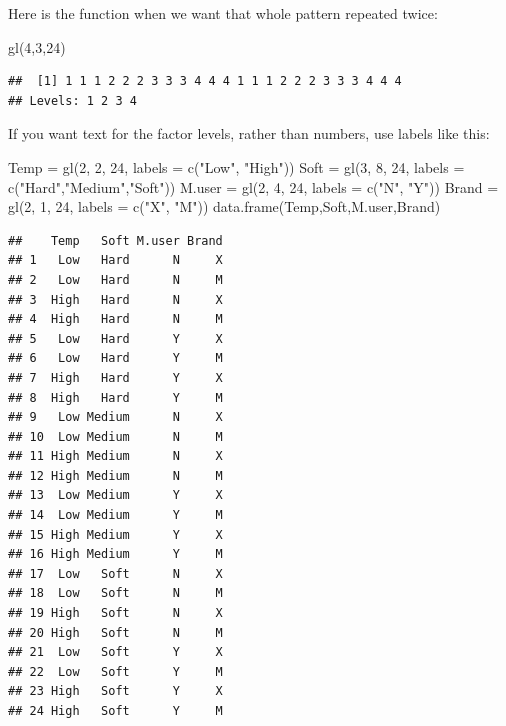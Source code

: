 \documentclass[
]{book}
\newenvironment{Shaded}{\begin{snugshade}}{\end{snugshade}}
\newcommand{\AttributeTok}[1]{\textcolor[rgb]{0.77,0.63,0.00}{#1}}
\newcommand{\DecValTok}[1]{\textcolor[rgb]{0.00,0.00,0.81}{#1}}
\newcommand{\FunctionTok}[1]{\textcolor[rgb]{0.00,0.00,0.00}{#1}}
\newcommand{\NormalTok}[1]{#1}
\newcommand{\OtherTok}[1]{\textcolor[rgb]{0.56,0.35,0.01}{#1}}
\newcommand{\StringTok}[1]{\textcolor[rgb]{0.31,0.60,0.02}{#1}}
\begin{document}
Here is the function when we want that whole pattern repeated twice:

\begin{Shaded}
\begin{Highlighting}[]
\FunctionTok{gl}\NormalTok{(}\DecValTok{4}\NormalTok{,}\DecValTok{3}\NormalTok{,}\DecValTok{24}\NormalTok{)}
\end{Highlighting}
\end{Shaded}

\begin{verbatim}
##  [1] 1 1 1 2 2 2 3 3 3 4 4 4 1 1 1 2 2 2 3 3 3 4 4 4
## Levels: 1 2 3 4
\end{verbatim}

If you want text for the factor levels, rather than numbers, use labels like this:

\begin{Shaded}
\begin{Highlighting}[]
\NormalTok{Temp }\OtherTok{=} \FunctionTok{gl}\NormalTok{(}\DecValTok{2}\NormalTok{, }\DecValTok{2}\NormalTok{, }\DecValTok{24}\NormalTok{, }\AttributeTok{labels =} \FunctionTok{c}\NormalTok{(}\StringTok{"Low"}\NormalTok{, }\StringTok{"High"}\NormalTok{))}
\NormalTok{Soft }\OtherTok{=} \FunctionTok{gl}\NormalTok{(}\DecValTok{3}\NormalTok{, }\DecValTok{8}\NormalTok{, }\DecValTok{24}\NormalTok{, }\AttributeTok{labels =} \FunctionTok{c}\NormalTok{(}\StringTok{"Hard"}\NormalTok{,}\StringTok{"Medium"}\NormalTok{,}\StringTok{"Soft"}\NormalTok{))}
\NormalTok{M.user }\OtherTok{=} \FunctionTok{gl}\NormalTok{(}\DecValTok{2}\NormalTok{, }\DecValTok{4}\NormalTok{, }\DecValTok{24}\NormalTok{, }\AttributeTok{labels =} \FunctionTok{c}\NormalTok{(}\StringTok{"N"}\NormalTok{, }\StringTok{"Y"}\NormalTok{))}
\NormalTok{Brand }\OtherTok{=} \FunctionTok{gl}\NormalTok{(}\DecValTok{2}\NormalTok{, }\DecValTok{1}\NormalTok{, }\DecValTok{24}\NormalTok{, }\AttributeTok{labels =} \FunctionTok{c}\NormalTok{(}\StringTok{"X"}\NormalTok{, }\StringTok{"M"}\NormalTok{))}
\FunctionTok{data.frame}\NormalTok{(Temp,Soft,M.user,Brand)}
\end{Highlighting}
\end{Shaded}

\begin{verbatim}
##    Temp   Soft M.user Brand
## 1   Low   Hard      N     X
## 2   Low   Hard      N     M
## 3  High   Hard      N     X
## 4  High   Hard      N     M
## 5   Low   Hard      Y     X
## 6   Low   Hard      Y     M
## 7  High   Hard      Y     X
## 8  High   Hard      Y     M
## 9   Low Medium      N     X
## 10  Low Medium      N     M
## 11 High Medium      N     X
## 12 High Medium      N     M
## 13  Low Medium      Y     X
## 14  Low Medium      Y     M
## 15 High Medium      Y     X
## 16 High Medium      Y     M
## 17  Low   Soft      N     X
## 18  Low   Soft      N     M
## 19 High   Soft      N     X
## 20 High   Soft      N     M
## 21  Low   Soft      Y     X
## 22  Low   Soft      Y     M
## 23 High   Soft      Y     X
## 24 High   Soft      Y     M
\end{verbatim}
\end{document}
